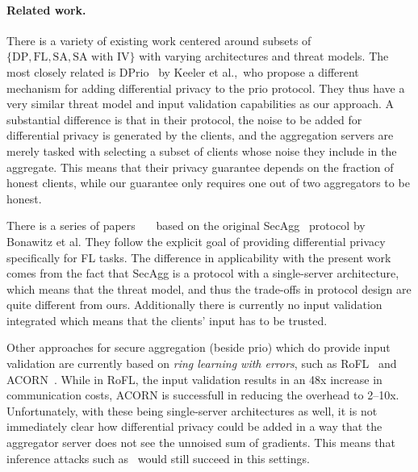 \documentclass{article}
\begin{document}
\paragraph{Related work.}
There is a variety of existing work centered around subsets of
$\{\textrm{DP}, \textrm{FL}, \textrm{SA}, \textrm{SA with IV}\}$ with varying
architectures and threat models. The most closely related is
DPrio~\cite{dprio} by Keeler et al.,\ who propose a different mechanism for
adding differential privacy to the prio protocol. They thus have a very similar
threat model and input validation capabilities as our approach. A substantial
difference is that in their protocol, the noise to be added for differential
privacy is generated by the clients, and the aggregation servers are merely
tasked with selecting a subset of clients whose noise they include in the
aggregate. This means that their privacy guarantee depends on the fraction of
honest clients, while our guarantee only requires one out of two aggregators to
be honest.

There is a series of papers~\cite{Kairouz2021TheDD}~\cite{}~\cite{} based on the original
SecAgg~\cite{secagg} protocol by Bonawitz et al. They follow the explicit goal
of providing differential privacy specifically for FL tasks.
The difference in applicability with the present work comes from the fact that SecAgg is a protocol
with a single-server architecture, which means that the threat model, and thus
the trade-offs in protocol design are quite different from ours. Additionally
there is currently no input validation integrated which means that the clients'
input has to be trusted.

Other approaches for secure aggregation (beside prio) which do provide input validation are currently based on
\textit{ring learning with errors}, such as RoFL~\cite{} and ACORN~\cite{acorn}.
While in RoFL, the input validation results in an 48x increase in communication
costs, ACORN is successfull in reducing the overhead to 2--10x. Unfortunately,
with these being single-server architectures as well, it is not immediately
clear how differential privacy could be added in a way that the aggregator
server does not see the unnoised sum of gradients. This means that inference
attacks such as~\cite{7958568} would still succeed in this settings.
\end{document}
